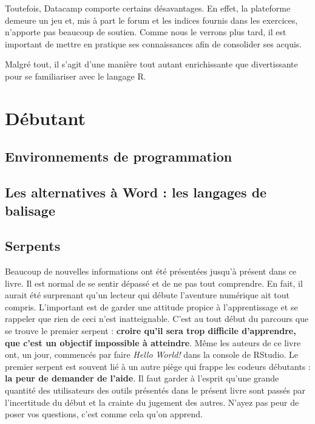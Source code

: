 \documentclass[
  letterpaper,
]{scrbook}
\begin{document}
Toutefois, Datacamp comporte certains désavantages. En effet, la
plateforme demeure un jeu et, mis à part le forum et les indices fournis
dans les exercices, n'apporte pas beaucoup de soutien. Comme nous le
verrons plus tard, il est important de mettre en pratique ses
connaissances afin de consolider ses acquis.

Malgré tout, il s'agit d'une manière tout autant enrichissante que
divertissante pour se familiariser avec le langage R.

\hypertarget{duxe9butant}{%
\section{Débutant}\label{duxe9butant}}

\hypertarget{environnements-de-programmation}{%
\subsection{Environnements de
programmation}\label{environnements-de-programmation}}

\hypertarget{les-alternatives-uxe0-word-les-langages-de-balisage}{%
\subsection{Les alternatives à Word : les langages de
balisage}\label{les-alternatives-uxe0-word-les-langages-de-balisage}}

\hypertarget{serpents}{%
\subsection{Serpents}\label{serpents}}

Beaucoup de nouvelles informations ont été présentées jusqu'à présent
dans ce livre. Il est normal de se sentir dépassé et de ne pas tout
comprendre. En fait, il aurait été surprenant qu'un lecteur qui débute
l'aventure numérique ait tout compris. L'important est de garder une
attitude propice à l'apprentissage et se rappeler que rien de ceci n'est
inatteignable. C'est au tout début du parcours que se trouve le premier
serpent : \textbf{croire qu'il sera trop difficile d'apprendre, que
c'est un objectif impossible à atteindre}. Même les auteurs de ce livre
ont, un jour, commencés par faire \emph{Hello World!} dans la console de
RStudio. Le premier serpent est souvent lié à un autre piège qui frappe
les codeurs débutants : \textbf{la peur de demander de l'aide}. Il faut
garder à l'esprit qu'une grande quantité des utilisateurs des outils
présentés dans le présent livre sont passés par l'incertitude du début
et la crainte du jugement des autres. N'ayez pas peur de poser vos
questions, c'est comme cela qu'on apprend.
\end{document}
